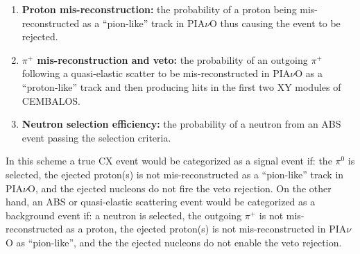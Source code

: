 \begin{enumerate}
\item{{\bf Proton mis-reconstruction:} the probability of a proton being mis-reconstructed as a ``pion-like'' track in PIA$\nu$O thus causing the event to be rejected.}

\item{{\bf $\pi^{+}$ mis-reconstruction and veto:} the probability of an outgoing $\pi^{+}$ following a quasi-elastic scatter to be mis-reconstructed in PIA$\nu$O as a ``proton-like'' track and then producing hits in the first two XY modules of CEMBALOS.}

\item{{\bf Neutron selection efficiency:} the probability of a neutron from an ABS event passing the selection criteria.}
\end{enumerate}

In this scheme a true CX event would be categorized as a signal event if: the $\pi^{0}$ is selected, the ejected proton(s) is not mis-reconstructed as a ``pion-like'' track in PIA$\nu$O, and the ejected nucleons do not fire the veto rejection. On the other hand, an ABS or quasi-elastic scattering event would be categorized as a background event if: a neutron is selected, the outgoing $\pi^{+}$ is not mis-reconstructed as a proton, the ejected proton(s) is not mis-reconstructed in PIA$\nu$O as ``pion-like'', and the the ejected nucleons do not enable the veto rejection. 

